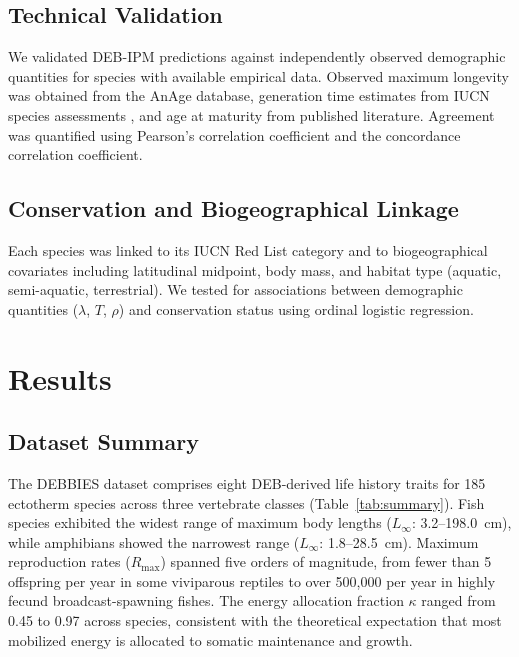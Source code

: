 \documentclass[11pt]{article}
\begin{document}
\subsection{Technical Validation}

We validated DEB-IPM predictions against independently observed demographic quantities for species with available empirical data. Observed maximum longevity was obtained from the AnAge database, generation time estimates from IUCN species assessments \citep{iucn2023}, and age at maturity from published literature. Agreement was quantified using Pearson's correlation coefficient and the concordance correlation coefficient.

\subsection{Conservation and Biogeographical Linkage}

Each species was linked to its IUCN Red List category \citep{iucn2023} and to biogeographical covariates including latitudinal midpoint, body mass, and habitat type (aquatic, semi-aquatic, terrestrial). We tested for associations between demographic quantities ($\lambda$, $T$, $\rho$) and conservation status using ordinal logistic regression.

\section{Results}

\subsection{Dataset Summary}

The DEBBIES dataset comprises eight DEB-derived life history traits for 185 ectotherm species across three vertebrate classes (Table~\ref{tab:summary}). Fish species exhibited the widest range of maximum body lengths ($L_\infty$: 3.2--198.0~cm), while amphibians showed the narrowest range ($L_\infty$: 1.8--28.5~cm). Maximum reproduction rates ($R_{\max}$) spanned five orders of magnitude, from fewer than 5 offspring per year in some viviparous reptiles to over 500,000 per year in highly fecund broadcast-spawning fishes. The energy allocation fraction $\kappa$ ranged from 0.45 to 0.97 across species, consistent with the theoretical expectation that most mobilized energy is allocated to somatic maintenance and growth.
\end{document}

